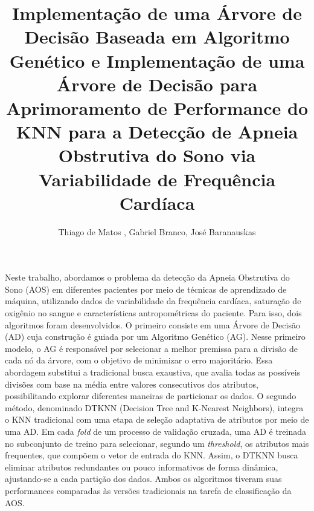 \documentclass[12pt]{article}
\title{Implementação de uma Árvore de Decisão Baseada em Algoritmo Genético e Implementação de uma Árvore de Decisão para Aprimoramento de Performance do KNN para a Detecção de Apneia Obstrutiva do Sono via Variabilidade de Frequência Cardíaca}
\author{Thiago de Matos \inst{1}, Gabriel Branco\inst{2}, José Baranauskas\inst{1}}
\begin{document}
 

\maketitle

\begin{resumo} 
Neste trabalho, abordamos o problema da detecção da Apneia Obstrutiva do Sono (AOS) em diferentes pacientes por meio de técnicas de aprendizado de máquina, utilizando dados de variabilidade da frequência cardíaca, saturação de oxigênio no sangue e características antropométricas do paciente. Para isso, dois algoritmos foram desenvolvidos. O primeiro consiste em uma Árvore de Decisão (AD) cuja construção é guiada por um Algoritmo Genético (AG). Nesse primeiro modelo, o AG é responsável por selecionar a melhor premissa para a divisão de cada nó da árvore, com o objetivo de minimizar o erro majoritário. Essa abordagem substitui a tradicional busca exaustiva, que avalia todas as possíveis divisões com base na média entre valores consecutivos dos atributos, possibilitando explorar diferentes maneiras de particionar os dados. O segundo método, denominado DTKNN (Decision Tree and K-Nearest Neighbors), integra o KNN tradicional com uma etapa de seleção adaptativa de atributos por meio de uma AD. Em cada \textit{fold} de um processo de validação cruzada, uma AD é treinada no subconjunto de treino para selecionar, segundo um \textit{threshold}, os atributos mais frequentes, que compõem o vetor de entrada do KNN. Assim, o DTKNN busca eliminar atributos redundantes ou pouco informativos de forma dinâmica, ajustando-se a cada partição dos dados. Ambos os algoritmos tiveram suas performances comparadas às versões tradicionais na tarefa de classificação da AOS.
\end{resumo}














\appendix
\clearpage  


\end{document}

